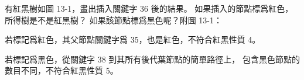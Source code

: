 \startEXERCISE
有紅黑樹如圖 13-1，畫出插入關鍵字 $36$ 後的結果。
如果插入的節點標爲紅色，所得樹是不是紅黑樹？
如果該節點標爲黑色呢？附圖 13-1：

\stopEXERCISE

\startANSWER
若標記爲紅色，其父節點關鍵字爲 $35$，也是紅色，不符合紅黑性質 4。

若標記爲黑色，從關鍵字 $38$ 到其所有後代葉節點的簡單路徑上，
包含黑色節點的數目不同，不符合紅黑性質 5。
\stopANSWER

